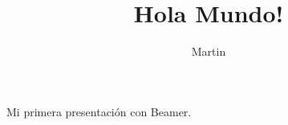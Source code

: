 \documentclass[12pt]{beamer}
\title{Hola Mundo!}
\author{Martin}
\begin{document}
\frame{\titlepage}
\begin{frame}
Mi primera presentación con Beamer.
\end{frame}
\end{document}
